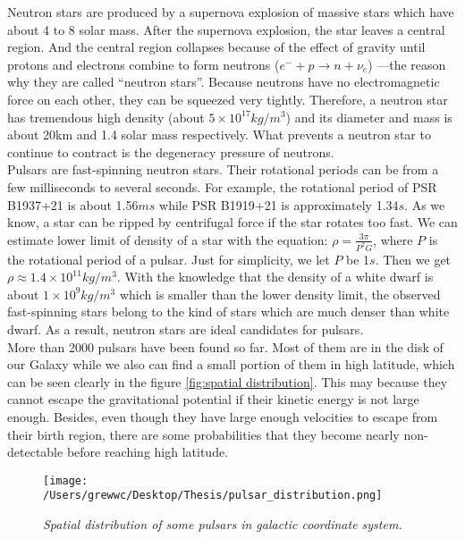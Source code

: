 \documentclass[12pt]{report}
\begin{document}
        Neutron stars are produced by a supernova explosion of massive stars which have about 4 to 8 
        solar mass. After 
        the supernova explosion, the star leaves a central region. And the central region collapses because 
        of the effect of 
        gravity until protons and electrons combine to form neutrons ($e^{-}+p\rightarrow n+\nu_{e}$)
        ---the reason why they are called 
        ``neutron stars''.  
        Because neutrons have no electromagnetic force on each other, they can be squeezed very tightly. 
        Therefore, a neutron  
        star has tremendous high density (about $5\times 10^{17} kg/m^3$) and its diameter and mass is about
        20km and 
        1.4 solar mass respectively. What
        prevents a neutron star to continue to contract is the degeneracy pressure of neutrons. \\
        \indent Pulsars are fast-spinning neutron stars. Their rotational periods can be from a few 
        milliseconds
        to several seconds. For example, the rotational period of PSR B1937+21 is about 1.56$ms$ while 
        PSR B1919+21 is approximately 1.34$s$. As we know, a star can be ripped by centrifugal force if the
        star rotates too fast. We can estimate lower limit of density of a star with the equation: 
        $\rho=\frac{3\pi}{P^2G}$, where $P$ is the rotational period of a pulsar. Just for simplicity, we
        let $P$ be 1$s$. Then we get $\rho\approx 1.4\times 10^{11}kg/m^3$. With the knowledge  that the 
        density of a white dwarf is about $1\times 10^9kg/m^3$ which is smaller than the lower density limit,
        the observed fast-spinning stars belong to the kind of stars which are much denser 
        than white dwarf. As a result, neutron stars are ideal candidates for pulsars. \\
        \indent 
        More than 2000 pulsars have been found so far. Most of them are in the disk of our Galaxy while we also can 
        find a small portion of them in high latitude, which can be seen clearly in the figure \ref{fig:spatial 
        distribution}. This may 
        because they cannot escape the gravitational potential if their kinetic energy is not large enough. Besides,
        even though they have large enough velocities to escape from their birth region, there are some 
        probabilities that they become nearly non-detectable before reaching high latitude. 
        
        \begin{figure}[h]
          \centering
          \texttt{[image: /Users/grewwc/Desktop/Thesis/pulsar\_distribution.png]}
          \caption{\textit{\footnotesize Spatial distribution of some pulsars in galactic coordinate system.}}
          \label{fig:spatial distribution}
        \end{figure}
        
\end{document}
